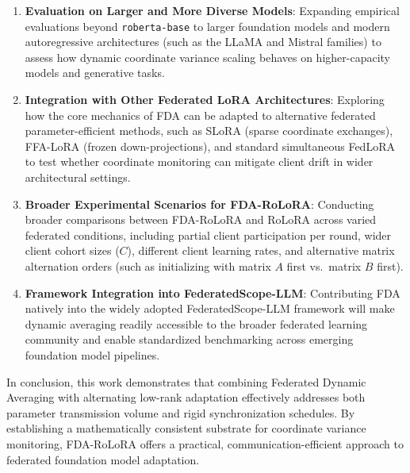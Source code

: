 \begin{enumerate}
    \item \textbf{Evaluation on Larger and More Diverse Models}: Expanding empirical evaluations beyond \texttt{roberta-base} to larger foundation models and modern autoregressive architectures (such as the LLaMA and Mistral families) to assess how dynamic coordinate variance scaling behaves on higher-capacity models and generative tasks.
    
    \item \textbf{Integration with Other Federated LoRA Architectures}: Exploring how the core mechanics of FDA can be adapted to alternative federated parameter-efficient methods, such as SLoRA \cite{babakniya2023slora} (sparse coordinate exchanges), FFA-LoRA \cite{sun2024improving} (frozen down-projections), and standard simultaneous FedLoRA to test whether coordinate monitoring can mitigate client drift in wider architectural settings.
    
    \item \textbf{Broader Experimental Scenarios for FDA-RoLoRA}: Conducting broader comparisons between FDA-RoLoRA and RoLoRA across varied federated conditions, including partial client participation per round, wider client cohort sizes ($C$), different client learning rates, and alternative matrix alternation orders (such as initializing with matrix $A$ first vs.\ matrix $B$ first).
    
    \item \textbf{Framework Integration into FederatedScope-LLM}: Contributing FDA natively into the widely adopted FederatedScope-LLM framework \cite{kuang2023federatedscope} will make dynamic averaging readily accessible to the broader federated learning community and enable standardized benchmarking across emerging foundation model pipelines.
\end{enumerate}

In conclusion, this work demonstrates that combining Federated Dynamic Averaging with alternating low-rank adaptation effectively addresses both parameter transmission volume and rigid synchronization schedules. By establishing a mathematically consistent substrate for coordinate variance monitoring, FDA-RoLoRA offers a practical, communication-efficient approach to federated foundation model adaptation.
